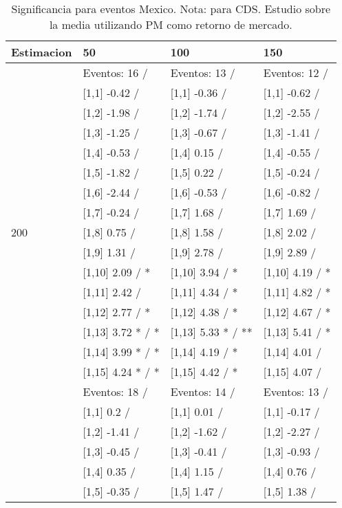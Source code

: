 \begin{table}

\caption{Significancia para eventos Mexico. Nota: para CDS. Estudio sobre la media utilizando PM como retorno de mercado.}
\centering
\begin{tabular}[t]{llll}
\toprule
Estimacion & 50 & 100 & 150\\
\midrule
 & Eventos:  16 / & Eventos:  13 / & Eventos:  12 /\\
 & {}[1,1] -0.42  / & {}[1,1] -0.36  / & {}[1,1] -0.62  /\\
 & {}[1,2] -1.98  / & {}[1,2] -1.74  / & {}[1,2] -2.55  /\\
 & {}[1,3] -1.25  / & {}[1,3] -0.67  / & {}[1,3] -1.41  /\\
 & {}[1,4] -0.53  / & {}[1,4] 0.15  / & {}[1,4] -0.55  /\\
\addlinespace
 & {}[1,5] -1.82  / & {}[1,5] 0.22  / & {}[1,5] -0.24  /\\
 & {}[1,6] -2.44  / & {}[1,6] -0.53  / & {}[1,6] -0.82  /\\
 & {}[1,7] -0.24  / & {}[1,7] 1.68  / & {}[1,7] 1.69  /\\
200 & {}[1,8] 0.75  / & {}[1,8] 1.58  / & {}[1,8] 2.02  /\\
 & {}[1,9] 1.31  / & {}[1,9] 2.78  / & {}[1,9] 2.89  /\\
\addlinespace
 & {}[1,10] 2.09  / * & {}[1,10] 3.94  / * & {}[1,10] 4.19  / *\\
 & {}[1,11] 2.42  / & {}[1,11] 4.34  / * & {}[1,11] 4.82  / *\\
 & {}[1,12] 2.77  / * & {}[1,12] 4.38  / * & {}[1,12] 4.67  / *\\
 & {}[1,13] 3.72 * / * & {}[1,13] 5.33 * / ** & {}[1,13] 5.41  / *\\
 & {}[1,14] 3.99 * / * & {}[1,14] 4.19  / * & {}[1,14] 4.01  /\\
\addlinespace
 & {}[1,15] 4.24 * / * & {}[1,15] 4.42  / * & {}[1,15] 4.07  /\\
 & Eventos:  18 / & Eventos:  14 / & Eventos:  13 /\\
 & {}[1,1] 0.2  / & {}[1,1] 0.01  / & {}[1,1] -0.17  /\\
 & {}[1,2] -1.41  / & {}[1,2] -1.62  / & {}[1,2] -2.27  /\\
 & {}[1,3] -0.45  / & {}[1,3] -0.41  / & {}[1,3] -0.93  /\\
\addlinespace
 & {}[1,4] 0.35  / & {}[1,4] 1.15  / & {}[1,4] 0.76  /\\
 & {}[1,5] -0.35  / & {}[1,5] 1.47  / & {}[1,5] 1.38  /\\

\end{tabular}
\end{table}
